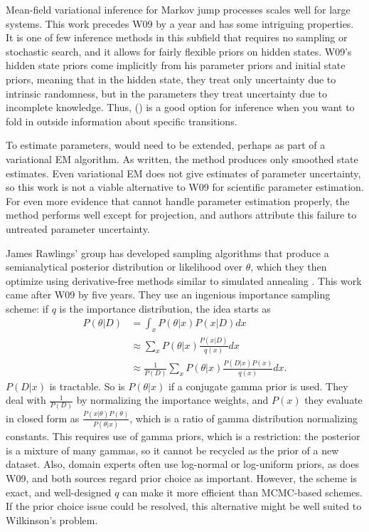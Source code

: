 \documentclass{article}
\begin{document}
Mean-field variational inference for Markov jump processes \cite{opper2008variational} scales well for large systems. This work precedes W09 by a year and has some intriguing properties. It is one of few inference methods in this subfield that requires no sampling or stochastic search, and it allows for fairly flexible priors on hidden states. W09's hidden state priors come implicitly from his parameter priors and initial state priors, meaning that in the hidden state, they treat only uncertainty due to intrinsic randomness, but in the parameters they treat uncertainty due to incomplete knowledge. Thus, (\cite{opper2008variational}) is a good option for inference when you want to fold in outside information about specific transitions.

To estimate parameters, \cite{opper2008variational} would need to be extended, perhaps as part of a variational EM algorithm. As written, the method produces only smoothed state estimates. Even variational EM does not give estimates of parameter uncertainty, so this work is not a viable alternative to W09 for scientific parameter estimation. For even more evidence that \cite{opper2008variational} cannot handle parameter estimation properly, the method performs well except for projection, and authors attribute this failure to untreated parameter uncertainty. 

James Rawlings' group has developed sampling algorithms that produce a semianalytical posterior distribution or likelihood over $\theta$, which they then optimize using derivative-free methods similar to simulated annealing \cite{gupta2014comparison,srivastava_rawlings2014stoch_opt}.   This work came after W09 by five years. They use an ingenious importance sampling scheme: if $q$ is the importance distribution, the idea starts as
\begin{align*}
P(\theta|D) &= \int_x P(\theta|x)P(x|D) dx\\
&\approx \sum_x P(\theta|x)\frac{P(x|D)}{q(x)} dx\\
&\approx \frac{1}{P(D)}\sum_x P(\theta|x)\frac{P(D|x)P(x)}{q(x)} dx.
\end{align*}
$P(D|x)$ is tractable. So is $P(\theta|x)$ if a conjugate gamma prior is used. They deal with $\frac{1}{P(D)}$ by normalizing the importance weights, and $P(x)$ they evaluate in closed form as $\frac{P(x|\theta)P(\theta)}{P(\theta|x)}$, which is a ratio of gamma distribution normalizing constants. This requires use of gamma priors, which is a restriction: the posterior is a mixture of many gammas, so it cannot be recycled as the prior of a new dataset. Also, domain experts 
often use log-normal or log-uniform priors, as does W09, and both sources regard prior choice as important. However, the scheme is exact, and well-designed $q$ can make it more efficient than MCMC-based schemes. If the prior choice issue could be resolved, this alternative might be well suited to Wilkinson's problem. 
\end{document}
